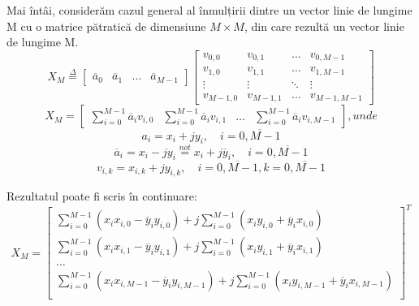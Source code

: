 Mai întâi, considerăm cazul general al înmulțirii dintre un vector
linie de lungime M cu o matrice pătratică de dimensiune $M \times M$, din care
rezultă un vector linie de lungime M.
\begin{equation}
    X_M
    \overset{\Delta}{=}
    \begin{bmatrix}
        \overline{a}_0   &   \overline{a}_1   &   \hdots   &   \overline{a}_{M-1}
    \end{bmatrix}
    \begin{bmatrix}
        v_{0,0}   &   v_{0,1}   &   \hdots   &   v_{0,M-1} \\
        v_{1,0}   &   v_{1,1}   &   \hdots   &   v_{1,M-1} \\
        \vdots    &   \vdots    &   \ddots   &   \vdots    \\
        v_{M-1,0} &   v_{M-1,1} &   \hdots   &   v_{M-1,M-1}
    \end{bmatrix}
\end{equation}
\begin{equation}
    X_M
    =
    \begin{bmatrix}
        \displaystyle{\sum_{i=0}^{M-1} \overline{a}_iv_{i,0}} & 
        \displaystyle{\sum_{i=0}^{M-1} \overline{a}_iv_{i,1}} & 
        \hdots &
        \displaystyle{\sum_{i=0}^{M-1} \overline{a}_iv_{i,M-1}}
    \end{bmatrix}
    , unde
\end{equation}
\begin{equation}
a_i = x_i + jy_i, \quad i = \overline{0, M-1}
\end{equation}
\begin{equation}
\overline{a}_i = x_i - jy_i \overset{not}{=} x_i + j\overline{y}_i, \quad i = \overline{0, M-1}
\end{equation}
\begin{equation}
v_{i,k} = x_{i,k} + jy_{i,k}, \quad i = \overline{0, M-1}, k = \overline{0, M-1}
\end{equation}

Rezultatul poate fi scris în continuare:
\begin{equation}
X_M
=
\begin{bmatrix}
  \displaystyle{\sum_{i=0}^{M-1} (x_ix_{i,0} - \overline{y}_iy_{i,0}) + 
               j\sum_{i=0}^{M-1} (x_iy_{i,0} + \overline{y}_ix_{i,0})} \\ 
  \displaystyle{\sum_{i=0}^{M-1} (x_ix_{i,1} - \overline{y}_iy_{i,1}) + 
               j\sum_{i=0}^{M-1} (x_iy_{i,1} + \overline{y}_ix_{i,1})} \\
  \hdots \\
  \displaystyle{\sum_{i=0}^{M-1} (x_ix_{i,M-1} - \overline{y}_iy_{i,M-1}) + 
               j\sum_{i=0}^{M-1} (x_iy_{i,M-1} + \overline{y}_ix_{i,M-1})} \\ 
\end{bmatrix}^T
\label{eq:expresie-inmultire}
\end{equation}

